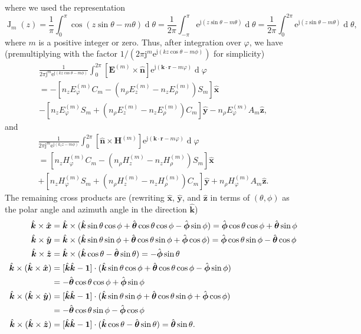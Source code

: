\documentclass[a4paper,12pt]{article}
\renewcommand{\vec}[1]{\boldsymbol{#1}}
\newcommand{\unitvec}[1]{\hat{\vec{#1}}}
\newcommand{\mrm}[1]{\mathrm{#1}}
\newcommand{\diff}{\operatorname{d}\!}
\newcommand{\mat}[1]{\mathbf{#1}}
\newcommand{\ju}{\mrm{j}}
\newcommand{\eu}{\mrm{e}}
\newcommand{\Ev}{\vec{E}}
\newcommand{\Hv}{\vec{H}}
\newcommand{\rv}{\vec{r}}
\newcommand{\kv}{\vec{k}}
\newcommand{\xuv}{\unitvec{x}}
\newcommand{\yuv}{\unitvec{y}}
\newcommand{\zuv}{\unitvec{z}}
\newcommand{\nuv}{\unitvec{n}}
\newcommand{\kuv}{\unitvec{k}}
\newcommand{\thetauv}{\unitvec{\theta}}
\newcommand{\phiuv}{\unitvec{\phi}}
\newcommand{\BesselJ}{\operatorname{J}}
\begin{document}
where we used the representation \cite[9.1.21]{Abramowitz+Stegun1970}
\begin{equation}
  \BesselJ_{m}(z) = \frac{1}{\pi}\int_{0}^{\pi}\cos(z\sin\theta-m\theta)\diff\theta = \frac{1}{2\pi}\int_{-\pi}^{\pi}\eu^{\ju(z\sin\theta-m\theta)}\diff\theta = \frac{1}{2\pi}\int_{0}^{2\pi}\eu^{\ju(z\sin\theta-m\theta)}\diff\theta,
\end{equation}
where $m$ is a positive integer or zero. Thus, after integration over
$\varphi$, we have (premultiplying with the factor
$1/(2\pi\ju^{m}\eu^{\ju(kz\cos\theta-m\phi)})$ for simplicity)
\begin{multline}
  \frac{1}{2\pi\ju^{m}\eu^{\ju(kz\cos\theta-m\phi)}}\int_{0}^{2\pi}
  [\Ev^{(m)}\times\nuv]\eu^{\ju(\kv\cdot\rv-m\varphi)}\diff\varphi \\
  = -\left[ n_{z}E_{\varphi}^{(m)}C_{m}
  - (n_{\rho}E_{z}^{(m)} - n_{z}E_{\rho}^{(m)})S_{m} \right]\xuv \\
  - \left[ n_{z}E_{\varphi}^{(m)}S_{m}
  + (n_{\rho}E_{z}^{(m)} - n_{z}E_{\rho}^{(m)}) C_{m} \right] \yuv 
  - n_{\rho}E_{\varphi}^{(m)}A_{m} \zuv,
\end{multline}
and
\begin{multline}
  \frac{1}{2\pi\ju^{m}\eu^{\ju(k_{z}z-m\phi)}}\int_{0}^{2\pi}
  [\nuv\times\Hv^{(m)}]\eu^{\ju(\kv\cdot\rv-m\varphi)}\diff\varphi \\
  = \left[ n_{z}H_{\varphi}^{(m)}C_{m}
  - (n_{\rho}H_{z}^{(m)} - n_{z}H_{\rho}^{(m)})S_{m} \right] \xuv \\
  + \left[n_{z}H_{\varphi}^{(m)}S_{m}
    + (n_{\rho}H_{z}^{(m)} - n_{z}H_{\rho}^{(m)})C_{m} \right] \yuv 
  + n_{\rho}H_{\varphi}^{(m)}A_{m} \zuv.
\end{multline}
The remaining cross products are (rewriting $\xuv$, $\yuv$, and $\zuv$
in terms of $(\theta,\phi)$ as the polar angle and azimuth angle in
the direction $\kuv$)
\begin{align}
  \kuv\times\xuv &= \kuv\times(\kuv\sin\theta\cos\phi + \thetauv\cos\theta\cos\phi - \phiuv\sin\phi) = \phiuv\cos\theta\cos\phi + \thetauv\sin\phi \\
  \kuv\times\yuv &= \kuv\times(\kuv\sin\theta\sin\phi + \thetauv\cos\theta\sin\phi + \phiuv\cos\phi) = \phiuv\cos\theta\sin\phi - \thetauv\cos\phi \\
  \kuv\times\zuv &= \kuv\times(\kuv\cos\theta - \thetauv\sin\theta) = -\phiuv\sin\theta \\
  \kuv\times(\kuv\times\xuv) &= [\kuv\kuv-\mat{1}]\cdot(\kuv\sin\theta\cos\phi + \thetauv\cos\theta\cos\phi - \phiuv\sin\phi) \notag \\
                 &= -\thetauv\cos\theta\cos\phi + \phiuv\sin\phi \\
  \kuv\times(\kuv\times\yuv) &= [\kuv\kuv-\mat{1}]\cdot(\kuv\sin\theta\sin\phi + \thetauv\cos\theta\sin\phi + \phiuv\cos\phi) \notag \\
  &= - \thetauv\cos\theta\sin\phi - \phiuv\cos\phi \\
  \kuv\times(\kuv\times\zuv) &= [\kuv\kuv-\mat{1}]\cdot(\kuv\cos\theta-\thetauv\sin\theta) = \thetauv\sin\theta.
\end{align}
\end{document}
